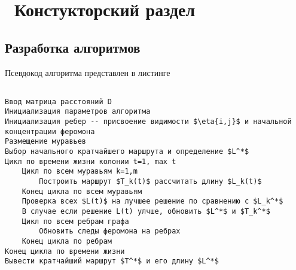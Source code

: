 \chapter{ Констукторский раздел}
\label{cha:design}
\section{ Разработка алгоритмов}

Псевдокод алгоритма представлен в листинге 

\begin{lstlisting}[caption={Псевдокод алгоритма муравья}, label={list:std}]

Ввод матрица расстояний D
Инициализация параметров алгоритма
Инициализация ребер -- присвоение видимости $\eta{i,j}$ и начальной концентрации феромона
Размещение муравьев
Выбор начального кратчайшего маршрута и определение $L^*$
Цикл по времени жизни колонии t=1, max t
    Цикл по всем муравьям k=1,m
        Построить маршрут $T_k(t)$ рассчитать длину $L_k(t)$
    Конец цикла по всем муравьям
    Проверка всех $L(t)$ на лучшее решение по сравнению с $L_k^*$
    В случае если решение L(t) улчше, обновить $L^*$ и $T_k^*$
    Цикл по всем ребрам графа
        Обновить следы феромона на ребрах
    Конец цикла по ребрам
Конец цикла по времени жизни
Вывести кратчайший маршрут $T^*$ и его длину $L^*$

\end{lstlisting}
